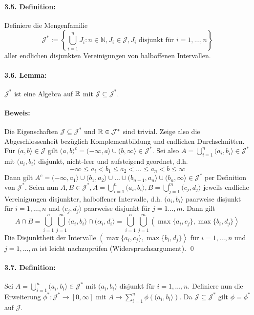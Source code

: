 \documentclass[12pt]{report}
\begin{document}
\paragraph{3.5. Definition:}Definiere die Mengenfamilie
$$\mathcal{J}^*:=\left\{\bigcup_{i=1}^nJ_i:n\in\mathbb{N},J_i\in\mathcal{J},J_i\text{ disjunkt f\"ur }i=1,\hdots,n\right\}$$
aller endlichen disjunkten Vereinigungen von halboffenen Intervallen. 

\paragraph{3.6. Lemma:}$\mathcal{J}^*$ ist eine Algebra auf $\mathbb{R}$ mit $\mathcal{J}\subseteq\mathcal{J}^*$.

\paragraph{Beweis:}Die Eigenschaften $\mathcal{J}\subseteq\mathcal{J}^*$ und $\mathbb{R}\in\mathcal{J}^*$ sind trivial. Zeige also die Abgeschlossenheit bez\"uglich Komplementbildung und endlichen Durchschnitten. \newline\newline
F\"ur $(a,b\rangle\in\mathcal{J}$ gilt $(a,b\rangle^c=(-\infty,a\rangle\cup(b,\infty\rangle\in\mathcal{J}^*$. Sei also $A=\bigcup_{i=1}^n(a_i,b_i\rangle\in\mathcal{J}^*$ mit $(a_i,b_i\rangle$ disjunkt, nicht-leer und aufsteigend geordnet, d.h.
$$-\infty\leq a_i<b_1\leq a_2<\hdots\leq a_n<b\leq\infty$$
Dann gilt $A^c=(-\infty,a_1\rangle\cup(b_1,a_2\rangle\cup\hdots\cup(b_{n-1},a_n\rangle\cup(b_n,\infty\rangle\in\mathcal{J}^*$ per Definition von $\mathcal{J}^*$.\newline\newline
Seien nun $A,B\in\mathcal{J}^*, A=\bigcup_{i=1}^n(a_i,b_i\rangle,B=\bigcup_{j=1}^m(c_j,d_j\rangle$ jeweils endliche Vereinigungen disjunkter, halboffener Intervalle, d.h. $(a_i,b_i\rangle$ paarweise disjunkt f\"ur $i=1,\hdots,n$ und $(c_j,d_j\rangle$ paarweise disjunkt f\"ur $j=1\hdots,m$. Dann gilt
$$A\cap B=\bigcup_{i=1}^n\bigcup_{j=1}^m(a_i,b_i\rangle\cap (\alpha_i,d_i\rangle=\bigcup_{i=1}^n\bigcup_{j=1}^m\left(\max\{a_i,c_j\},\max\{b_i,d_j\}\right\rangle$$
Die Disjunktheit der Intervalle $\left(\max\{a_i,c_j\},\max\{b_i,d_j\}\right\rangle$ f\"ur $i=1,\hdots,n$ und $j=1,\hdots,m$ ist leicht nachzupr\"ufen (Widerspruchsargument). \qed

\paragraph{3.7. Definition:}Sei $A=\bigcup_{i=1}^n(a_i,b_i\rangle\in\mathcal{J}^*$ mit $(a_i,b_i\rangle$ disjunkt f\"ur $i=1,\hdots,n$. Definiere nun die Erweiterung $\phi^*:\mathcal{J}^*\to[0,\infty]$ mit $A\mapsto\sum_{i=1}^n\phi\left((a_i,b_i\rangle\right)$. Da $\mathcal{J}\subseteq\mathcal{J}^*$ gilt $\phi=\phi^*$ auf $\mathcal{J}$.
\end{document}
